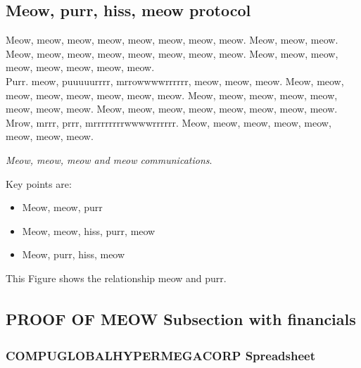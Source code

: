 \documentclass[9pt,oneside]{amsart}
\newenvironment{Figure}
  {\par\medskip\noindent\minipage{\linewidth}}
  {\endminipage\par\medskip}
\newcommand*\compu{COMPU\textsuperscript{\texttrademark}GLOBAL\textsuperscript{\texttrademark}HYPER\textsuperscript{\texttrademark}MEGA\textsuperscript{\texttrademark}CORP\textsuperscript{\texttrademark}}
\newcommand*\proofmeow{PROOF OF MEOW\textsuperscript{\textregistered}}
\newcommand*\lipsumeow{Meow, meow, meow, meow, meow, meow, meow, meow.  Meow, meow, meow. Meow, meow, meow, meow, meow, meow, meow, meow. Meow, meow, meow, meow, meow, meow, meow, meow. }
\newcommand*\lipsumeowpurr{Purr. meow, puuuuurrrr, mrrowwwwrrrrrr, meow, meow, meow. Meow, meow, meow, meow, meow, meow, meow, meow. Meow, meow, meow, meow, meow, meow, meow, meow. Meow, meow, meow, meow, meow, meow, meow, meow. Mrow, mrrr, prrr, mrrrrrrrrwwwwrrrrrr. Meow, meow, meow, meow, meow, meow, meow, meow.}
\begin{document}
\begin{multicols}{2}
\subsection{Meow, purr, hiss, meow protocol}\label{subsec:meow}

 \lipsumeow{}
 \\
 \lipsumeowpurr{}
 
\textit{Meow, meow, meow and meow communications}.  


\begin{Figure}
    \medskip
    \centering
    \medskip
\end{Figure}

Key points are:

\begin{itemize}
    \item Meow, meow, purr
    \item Meow, meow, hiss, purr, meow
    \item Meow, purr, hiss, meow
\end{itemize}


 This Figure shows the relationship meow and purr. 


\begin{Figure}
    \medskip
    \centering
    \medskip
\end{Figure}

\subsection{\proofmeow{} Subsection with financials}\label{subsec:financials_3}


\subsubsection{\compu{} Spreadsheet}\label{subsec:spreadsheet}


\end{multicols}
\end{document}
